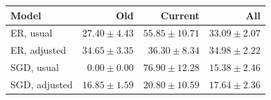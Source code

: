 \begin{tabular}{lrrr}
\toprule
Model & Old & Current & All\\
\midrule
ER, usual & $27.40\pm4.43$ & $55.85\pm10.71$ & $33.09\pm2.07$\\
ER, adjusted & $34.65\pm3.35$ & $36.30\pm8.34$ & $34.98\pm2.22$\\
SGD, usual & $0.00\pm0.00$ & $76.90\pm12.28$ & $15.38\pm2.46$\\
SGD, adjusted & $16.85\pm1.59$ & $20.80\pm10.59$ & $17.64\pm2.36$\\
\bottomrule
\end{tabular}
